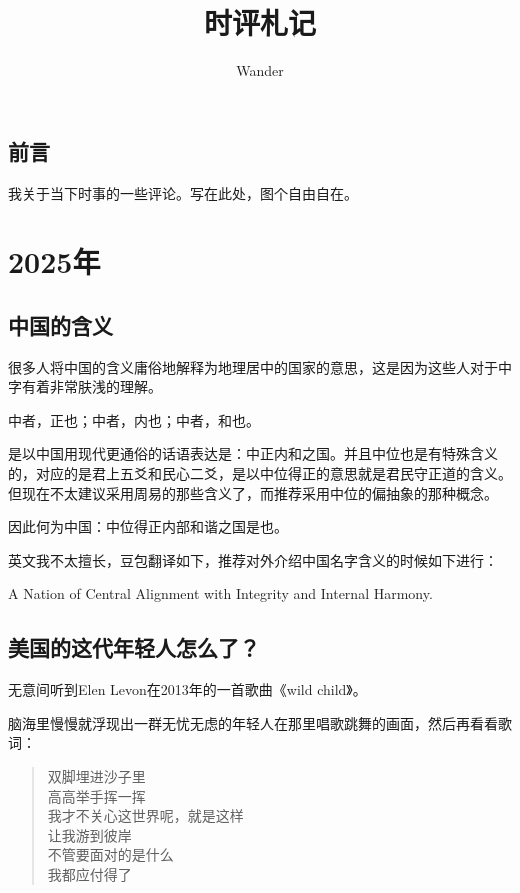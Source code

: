 \documentclass[12pt,oneside]{book}
\title{时评札记}
\author{Wander}
\newenvironment{shici}{%
\begin{verse}%
\centering\large\hspace{12pt}}%
{\end{verse}}
\begin{document}
\makemytitle



\frontmatter 
{}
\chapter*{前言}
我关于当下时事的一些评论。写在此处，图个自由自在。



\setcounter{tocdepth}{2}    
\tableofcontents


\mainmatter


\part{2025年}

\chapter{中国的含义}
很多人将中国的含义庸俗地解释为地理居中的国家的意思，这是因为这些人对于中字有着非常肤浅的理解。

中者，正也；中者，内也；中者，和也。

是以中国用现代更通俗的话语表达是：中正内和之国。并且中位也是有特殊含义的，对应的是君上五爻和民心二爻，是以中位得正的意思就是君民守正道的含义。但现在不太建议采用周易的那些含义了，而推荐采用中位的偏抽象的那种概念。

因此何为中国：中位得正内部和谐之国是也。

英文我不太擅长，豆包翻译如下，推荐对外介绍中国名字含义的时候如下进行：

A Nation of Central Alignment with Integrity and Internal Harmony.

\chapter{美国的这代年轻人怎么了？}
无意间听到Elen Levon在2013年的一首歌曲《wild child》。

脑海里慢慢就浮现出一群无忧无虑的年轻人在那里唱歌跳舞的画面，然后再看看歌词：

\begin{shici}
双脚埋进沙子里\\
高高举手挥一挥\\
我才不关心这世界呢，就是这样\\
让我游到彼岸\\
不管要面对的是什么\\
我都应付得了\\
\end{shici}
\end{document}
